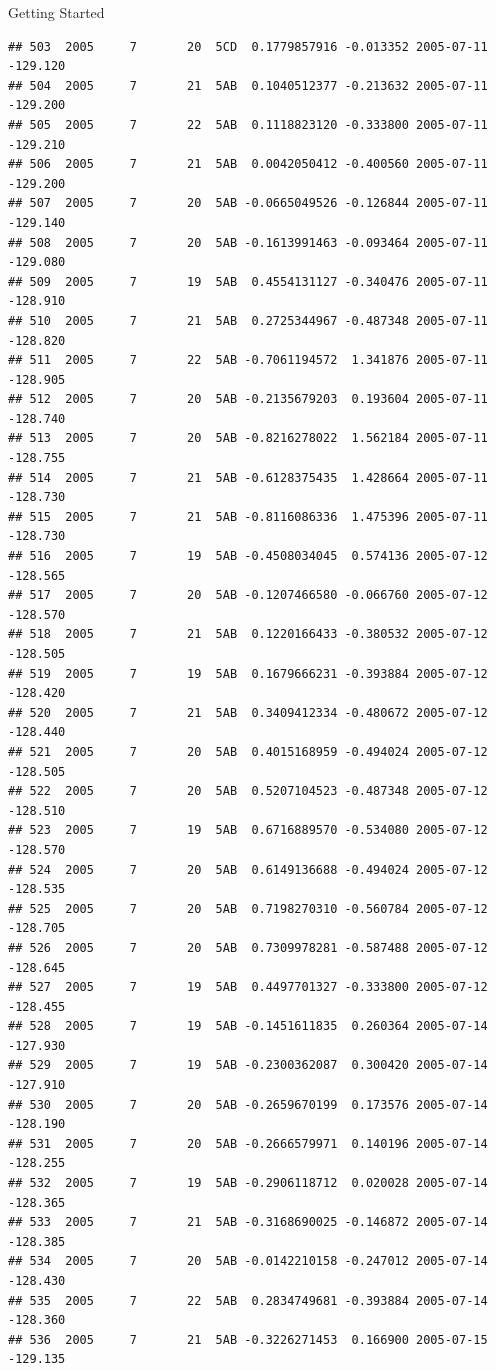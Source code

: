 \documentclass[
  ignorenonframetext,
]{beamer}
\begin{document}
\begin{frame}[fragile]{Getting Started}
\begin{verbatim}
## 503  2005     7       20  5CD  0.1779857916 -0.013352 2005-07-11 -129.120
## 504  2005     7       21  5AB  0.1040512377 -0.213632 2005-07-11 -129.200
## 505  2005     7       22  5AB  0.1118823120 -0.333800 2005-07-11 -129.210
## 506  2005     7       21  5AB  0.0042050412 -0.400560 2005-07-11 -129.200
## 507  2005     7       20  5AB -0.0665049526 -0.126844 2005-07-11 -129.140
## 508  2005     7       20  5AB -0.1613991463 -0.093464 2005-07-11 -129.080
## 509  2005     7       19  5AB  0.4554131127 -0.340476 2005-07-11 -128.910
## 510  2005     7       21  5AB  0.2725344967 -0.487348 2005-07-11 -128.820
## 511  2005     7       22  5AB -0.7061194572  1.341876 2005-07-11 -128.905
## 512  2005     7       20  5AB -0.2135679203  0.193604 2005-07-11 -128.740
## 513  2005     7       20  5AB -0.8216278022  1.562184 2005-07-11 -128.755
## 514  2005     7       21  5AB -0.6128375435  1.428664 2005-07-11 -128.730
## 515  2005     7       21  5AB -0.8116086336  1.475396 2005-07-11 -128.730
## 516  2005     7       19  5AB -0.4508034045  0.574136 2005-07-12 -128.565
## 517  2005     7       20  5AB -0.1207466580 -0.066760 2005-07-12 -128.570
## 518  2005     7       21  5AB  0.1220166433 -0.380532 2005-07-12 -128.505
## 519  2005     7       19  5AB  0.1679666231 -0.393884 2005-07-12 -128.420
## 520  2005     7       21  5AB  0.3409412334 -0.480672 2005-07-12 -128.440
## 521  2005     7       20  5AB  0.4015168959 -0.494024 2005-07-12 -128.505
## 522  2005     7       20  5AB  0.5207104523 -0.487348 2005-07-12 -128.510
## 523  2005     7       19  5AB  0.6716889570 -0.534080 2005-07-12 -128.570
## 524  2005     7       20  5AB  0.6149136688 -0.494024 2005-07-12 -128.535
## 525  2005     7       20  5AB  0.7198270310 -0.560784 2005-07-12 -128.705
## 526  2005     7       20  5AB  0.7309978281 -0.587488 2005-07-12 -128.645
## 527  2005     7       19  5AB  0.4497701327 -0.333800 2005-07-12 -128.455
## 528  2005     7       19  5AB -0.1451611835  0.260364 2005-07-14 -127.930
## 529  2005     7       19  5AB -0.2300362087  0.300420 2005-07-14 -127.910
## 530  2005     7       20  5AB -0.2659670199  0.173576 2005-07-14 -128.190
## 531  2005     7       20  5AB -0.2666579971  0.140196 2005-07-14 -128.255
## 532  2005     7       19  5AB -0.2906118712  0.020028 2005-07-14 -128.365
## 533  2005     7       21  5AB -0.3168690025 -0.146872 2005-07-14 -128.385
## 534  2005     7       20  5AB -0.0142210158 -0.247012 2005-07-14 -128.430
## 535  2005     7       22  5AB  0.2834749681 -0.393884 2005-07-14 -128.360
## 536  2005     7       21  5AB -0.3226271453  0.166900 2005-07-15 -129.135

\end{verbatim}
\end{frame}
\end{document}
